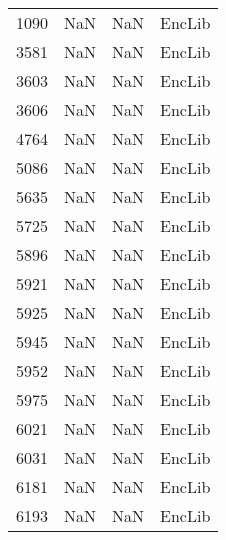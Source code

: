 \begin{tabular}{llll}
1090 &                   NaN &                        NaN &                                    EncLib \\
3581 &                   NaN &                        NaN &                                    EncLib \\
3603 &                   NaN &                        NaN &                                    EncLib \\
3606 &                   NaN &                        NaN &                                    EncLib \\
4764 &                   NaN &                        NaN &                                    EncLib \\
5086 &                   NaN &                        NaN &                                    EncLib \\
5635 &                   NaN &                        NaN &                                    EncLib \\
5725 &                   NaN &                        NaN &                                    EncLib \\
5896 &                   NaN &                        NaN &                                    EncLib \\
5921 &                   NaN &                        NaN &                                    EncLib \\
5925 &                   NaN &                        NaN &                                    EncLib \\
5945 &                   NaN &                        NaN &                                    EncLib \\
5952 &                   NaN &                        NaN &                                    EncLib \\
5975 &                   NaN &                        NaN &                                    EncLib \\
6021 &                   NaN &                        NaN &                                    EncLib \\
6031 &                   NaN &                        NaN &                                    EncLib \\
6181 &                   NaN &                        NaN &                                    EncLib \\
6193 &                   NaN &                        NaN &                                    EncLib \\

\end{tabular}
